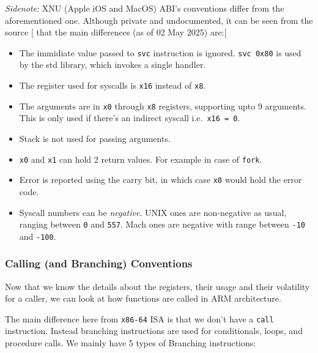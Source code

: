 \documentclass[a4paper, nobind]{templates/ociamthesis}
\providecommand{\tightlist}{%
  \setlength{\itemsep}{0pt}\setlength{\parskip}{0pt}}
\begin{document}
\emph{Sidenote:} XNU (Apple iOS and MacOS) ABI's conventions differ from the aforementioned one.
Although private and undocumented, it can be seen from the source {[}\citeproc{ref-apple-oss}{12}{]} that
the main differences (as of 02 May 2025) are:{[}\citeproc{ref-so-xnu-abi}{21}{]}

\begin{itemize}
\tightlist
\item
  The immidiate value passed to \texttt{svc} instruction is ignored. \texttt{svc\ 0x80} is used
  by the std library, which invokes a single handler.
\item
  The register used for syscalls is \texttt{x16} instead of \texttt{x8}.
\item
  The arguments are in \texttt{x0} through \texttt{x8} registers, supporting upto 9 arguments.
  This is only used if there's an indirect syscall i.e.~\texttt{x16\ =\ 0}.
\item
  Stack is not used for passing arguments.
\item
  \texttt{x0} and \texttt{x1} can hold 2 return values. For example in case of \texttt{fork}.
\item
  Error is reported using the carry bit, in which case \texttt{x0} would hold
  the error code.
\item
  Syscall numbers can be \emph{negative}.
  UNIX ones are non-negative as usual, ranging between \texttt{0} and \texttt{557}.
  Mach ones are negative with range between \texttt{-10} and \texttt{-100}.
\end{itemize}

\subsubsection{Calling (and Branching) Conventions}\label{calling-and-branching-conventions}

Now that we know the details about the registers, their usage and their volatility for a caller,
we can look at how functions are called in ARM architecture.

The main difference here from \texttt{x86-64} ISA is that we don't have a \texttt{call} instruction.
Instead branching instructions are used for conditionals, loops, and procedure calls.
We mainly have 5 types of Branching instructions:
\end{document}
